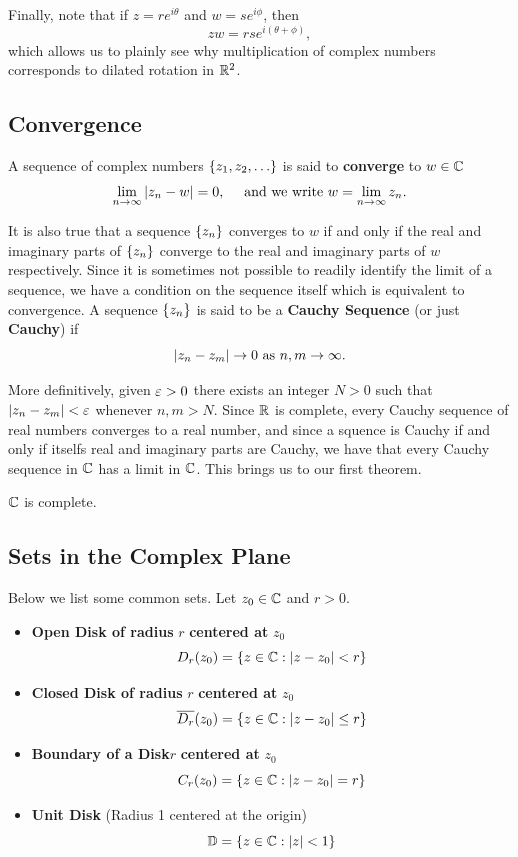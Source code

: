 \documentclass{exam}
\begin{document}
Finally, note that if $z = re^{i\theta}$ and $w = se^{i\phi}$, then
$$zw = rse^{i(\theta + \phi)},$$
which allows us to plainly see why multiplication of complex numbers corresponds to
dilated rotation in $\mathbb {R}^2$.

\subsection{Convergence}
A sequence of complex numbers $\left \{ z_1, z_2, \hdots \right \}$ is said to \textbf{converge} to $w\in\mathbb{C}$
$$\lim_{n\to\infty} \left| z_n - w \right| = 0, \quad \text{ and we write } w = \lim_{n\to\infty} z_n.$$

It is also true that a sequence $\left \{ z_n \right \}$ converges to $w$ if and only if the
real and imaginary parts of $\left \{ z_n \right \}$ converge to the real and imaginary parts of $w$ respectively.
Since it is sometimes not possible to readily identify the limit of a sequence, we have a condition
on the sequence itself which is equivalent to convergence. A  sequence $\left \{ z_n \right \}$ is said to be
a \textbf{Cauchy Sequence} (or just \textbf{Cauchy}) if
$$\left| z_n - z_m \right| \rightarrow 0 \text{ as } n,m\to\infty.$$

More definitively, given $\varepsilon > 0$ there exists an integer $N > 0$ such that $\left| z_n - z_m \right| < \varepsilon$
whenever $n,m > N$. Since $\mathbb {R}$ is complete, every Cauchy sequence of real numbers converges
to a real number, and since a squence is Cauchy if and only if itselfs real and imaginary parts are Cauchy,
we have that every Cauchy sequence in $\mathbb{C}$ has a limit in $\mathbb{C}$. This brings us to our first theorem.

\begin{theorem}\label{thm:main}
    $\mathbb{C}$ is complete.
\end{theorem}


\subsection{Sets in the Complex Plane}
Below we list some common sets. Let $z_0\in\mathbb{C}$ and $r > 0$.
\begin{itemize}
    \item \textbf{Open Disk of radius }$r$\textbf{ centered at }$z_0$
    $$D_r(z_0) = \left \{ z\in\mathbb{C} : \left| z - z_0 \right| < r \right \}$$
    \item \textbf{Closed Disk of radius }$r$\textbf{ centered at }$z_0$
    $$\overline{D_r}(z_0) = \left \{ z\in\mathbb{C} : \left| z - z_0 \right| \leq r \right \}$$
    \item \textbf{Boundary of a Disk}$r$\textbf{ centered at }$z_0$
    $$C_r(z_0) = \left \{ z\in\mathbb{C} : \left| z - z_0 \right| = r \right \}$$
    \item \textbf{Unit Disk}  (Radius 1 centered at the origin)
    $$\mathbb{D} = \left \{ z\in\mathbb{C} : \left| z \right| < 1 \right \}$$
\end{itemize}
\end{document}

